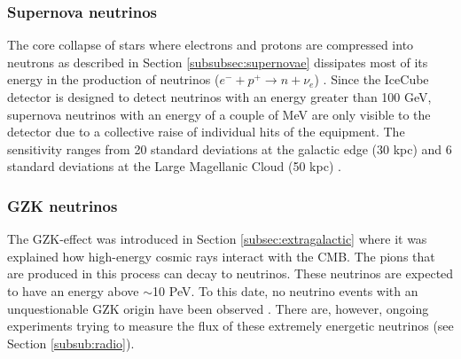 
\subsubsection{Supernova neutrinos}
The core collapse of stars where electrons and protons are compressed into neutrons as described in Section \ref{subsubsec:supernovae} dissipates most of its energy in the production of neutrinos ($e^- + p^+ \rightarrow n + \nu_e$) \cite{Scholberg:2012id}. Since the IceCube detector is designed to detect neutrinos with an energy greater than 100 GeV, supernova neutrinos with an energy of a couple of MeV are only visible to the detector due to a collective raise of individual hits of the equipment. The sensitivity ranges from 20 standard deviations at the galactic edge (30 kpc) and 6 standard deviations at the Large Magellanic Cloud (50 kpc) \cite{Kopke:2011xb}.

\subsubsection{GZK neutrinos}
The GZK-effect was introduced in Section \ref{subsec:extragalactic} where it was explained how high-energy cosmic rays interact with the CMB. The pions that are produced in this process can decay to neutrinos. These neutrinos are expected to have an energy above $\sim$10 PeV. To this date, no neutrino events with an unquestionable GZK origin have been observed \cite{Ishihara:2017szg}. There are, however, ongoing experiments trying to measure the flux of these extremely energetic neutrinos (see Section \ref{subsub:radio}).





